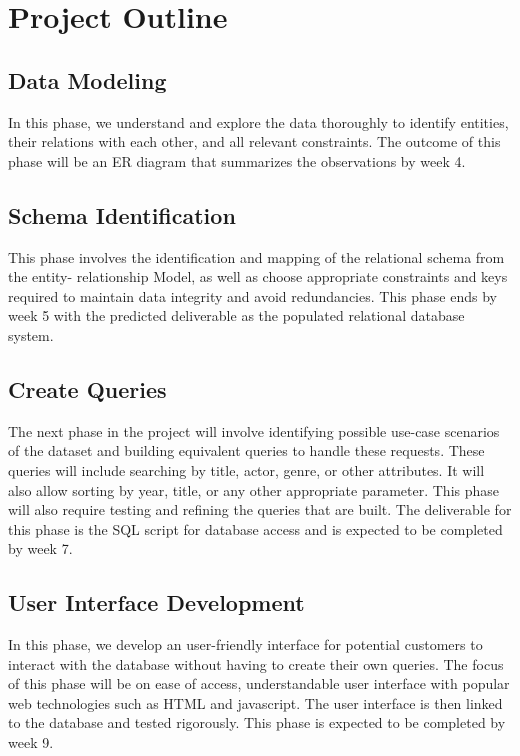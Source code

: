 \documentclass{sig-alternate}
\begin{document}
\section{Project Outline}
\subsection{Data Modeling}
In this phase, we understand and explore the data thoroughly to identify entities, their relations with each other, and all relevant constraints. The outcome of this phase will be an ER diagram that summarizes the observations by week 4. 
\subsection{Schema Identification}
This phase involves the identification and mapping of the relational schema from the entity- relationship Model, as well as choose appropriate constraints and keys required to maintain data integrity and avoid redundancies. This phase ends by week 5 with the predicted deliverable as the populated relational database system.
\subsection{Create Queries}
The next phase in the project will involve identifying possible use-case scenarios of the dataset and building equivalent queries to handle these requests. These queries will include searching by title, actor, genre, or other attributes. It will also allow sorting by year, title, or any other appropriate parameter. This phase will also require testing and refining the queries that are built. The deliverable for this phase is the SQL script for database access and is expected to be completed by week 7.
\subsection{User Interface Development}
In this phase, we develop an user-friendly interface for potential customers to interact with the database without having to create their own queries. The focus of this phase will be on ease of access, understandable user interface with popular web technologies such as HTML and javascript. The user interface is then linked to the database and tested rigorously. This phase is expected to be completed by week 9.
\end{document}

